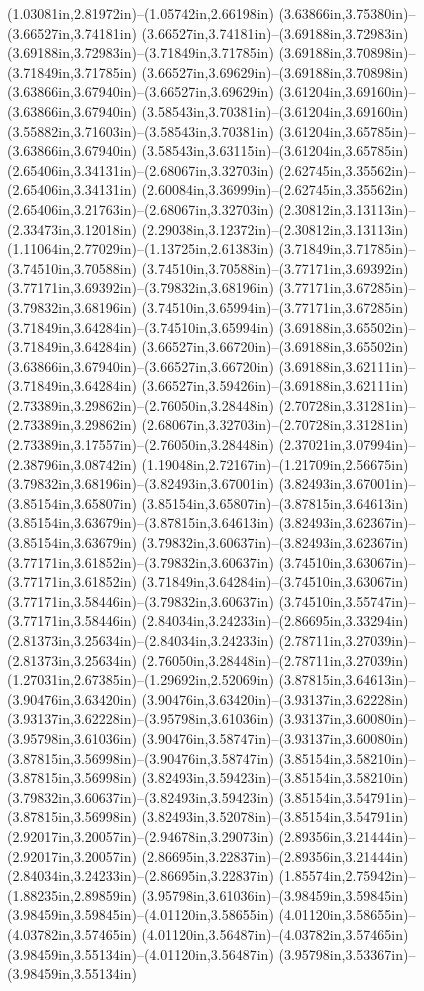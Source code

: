 (1.03081in,2.81972in)--(1.05742in,2.66198in) (3.63866in,3.75380in)--(3.66527in,3.74181in) (3.66527in,3.74181in)--(3.69188in,3.72983in) (3.69188in,3.72983in)--(3.71849in,3.71785in) (3.69188in,3.70898in)--(3.71849in,3.71785in) (3.66527in,3.69629in)--(3.69188in,3.70898in) (3.63866in,3.67940in)--(3.66527in,3.69629in) (3.61204in,3.69160in)--(3.63866in,3.67940in) (3.58543in,3.70381in)--(3.61204in,3.69160in) (3.55882in,3.71603in)--(3.58543in,3.70381in) (3.61204in,3.65785in)--(3.63866in,3.67940in) (3.58543in,3.63115in)--(3.61204in,3.65785in) (2.65406in,3.34131in)--(2.68067in,3.32703in) (2.62745in,3.35562in)--(2.65406in,3.34131in) (2.60084in,3.36999in)--(2.62745in,3.35562in) (2.65406in,3.21763in)--(2.68067in,3.32703in) (2.30812in,3.13113in)--(2.33473in,3.12018in) (2.29038in,3.12372in)--(2.30812in,3.13113in) (1.11064in,2.77029in)--(1.13725in,2.61383in) (3.71849in,3.71785in)--(3.74510in,3.70588in) (3.74510in,3.70588in)--(3.77171in,3.69392in) (3.77171in,3.69392in)--(3.79832in,3.68196in) (3.77171in,3.67285in)--(3.79832in,3.68196in) (3.74510in,3.65994in)--(3.77171in,3.67285in) (3.71849in,3.64284in)--(3.74510in,3.65994in) (3.69188in,3.65502in)--(3.71849in,3.64284in) (3.66527in,3.66720in)--(3.69188in,3.65502in) (3.63866in,3.67940in)--(3.66527in,3.66720in) (3.69188in,3.62111in)--(3.71849in,3.64284in) (3.66527in,3.59426in)--(3.69188in,3.62111in) (2.73389in,3.29862in)--(2.76050in,3.28448in) (2.70728in,3.31281in)--(2.73389in,3.29862in) (2.68067in,3.32703in)--(2.70728in,3.31281in) (2.73389in,3.17557in)--(2.76050in,3.28448in) (2.37021in,3.07994in)--(2.38796in,3.08742in) (1.19048in,2.72167in)--(1.21709in,2.56675in) (3.79832in,3.68196in)--(3.82493in,3.67001in) (3.82493in,3.67001in)--(3.85154in,3.65807in) (3.85154in,3.65807in)--(3.87815in,3.64613in) (3.85154in,3.63679in)--(3.87815in,3.64613in) (3.82493in,3.62367in)--(3.85154in,3.63679in) (3.79832in,3.60637in)--(3.82493in,3.62367in) (3.77171in,3.61852in)--(3.79832in,3.60637in) (3.74510in,3.63067in)--(3.77171in,3.61852in) (3.71849in,3.64284in)--(3.74510in,3.63067in) (3.77171in,3.58446in)--(3.79832in,3.60637in) (3.74510in,3.55747in)--(3.77171in,3.58446in) (2.84034in,3.24233in)--(2.86695in,3.33294in) (2.81373in,3.25634in)--(2.84034in,3.24233in) (2.78711in,3.27039in)--(2.81373in,3.25634in) (2.76050in,3.28448in)--(2.78711in,3.27039in) (1.27031in,2.67385in)--(1.29692in,2.52069in) (3.87815in,3.64613in)--(3.90476in,3.63420in) (3.90476in,3.63420in)--(3.93137in,3.62228in) (3.93137in,3.62228in)--(3.95798in,3.61036in) (3.93137in,3.60080in)--(3.95798in,3.61036in) (3.90476in,3.58747in)--(3.93137in,3.60080in) (3.87815in,3.56998in)--(3.90476in,3.58747in) (3.85154in,3.58210in)--(3.87815in,3.56998in) (3.82493in,3.59423in)--(3.85154in,3.58210in) (3.79832in,3.60637in)--(3.82493in,3.59423in) (3.85154in,3.54791in)--(3.87815in,3.56998in) (3.82493in,3.52078in)--(3.85154in,3.54791in) (2.92017in,3.20057in)--(2.94678in,3.29073in) (2.89356in,3.21444in)--(2.92017in,3.20057in) (2.86695in,3.22837in)--(2.89356in,3.21444in) (2.84034in,3.24233in)--(2.86695in,3.22837in) (1.85574in,2.75942in)--(1.88235in,2.89859in) (3.95798in,3.61036in)--(3.98459in,3.59845in) (3.98459in,3.59845in)--(4.01120in,3.58655in) (4.01120in,3.58655in)--(4.03782in,3.57465in) (4.01120in,3.56487in)--(4.03782in,3.57465in) (3.98459in,3.55134in)--(4.01120in,3.56487in) (3.95798in,3.53367in)--(3.98459in,3.55134in) 